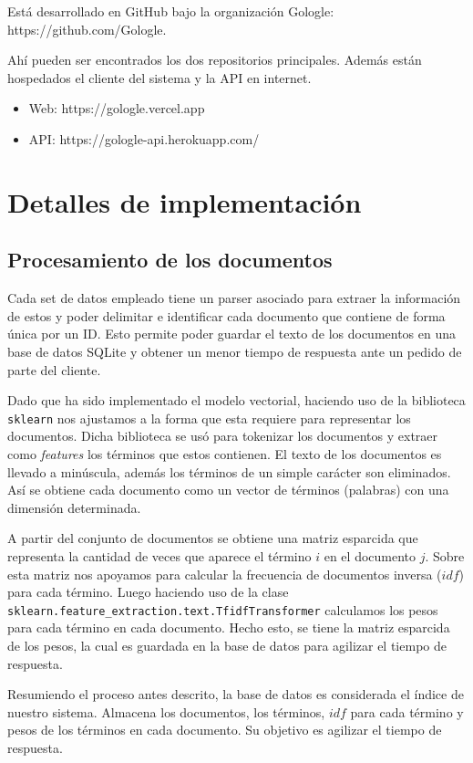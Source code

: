\documentclass[a4paper,11pt]{article}
\begin{document}
Está desarrollado en GitHub bajo la organización Gologle: https://github.com/Gologle.

Ahí pueden ser encontrados los dos repositorios principales. Además están hospedados el cliente del sistema y la API en internet.

\begin{itemize}
  \item Web: https://gologle.vercel.app
  \item API: https://gologle-api.herokuapp.com/
\end{itemize}

\section{Detalles de implementación}

\subsection{Procesamiento de los documentos}
Cada set de datos empleado tiene un parser asociado para extraer la información de estos y poder delimitar e identificar cada documento que contiene de forma única por un ID. Esto permite poder guardar el texto de los documentos en una base de datos SQLite y obtener un menor tiempo de respuesta ante un pedido de parte del cliente.

Dado que ha sido implementado el modelo vectorial, haciendo uso de la biblioteca \verb+sklearn+ nos ajustamos a la forma que esta requiere para representar los documentos. Dicha biblioteca se usó para tokenizar los documentos y extraer como \textit{features} los términos que estos contienen. El texto de los documentos es llevado a minúscula, además los términos de un simple carácter son eliminados. Así se obtiene cada documento como un vector de términos (palabras) con una dimensión determinada.

A partir del conjunto de documentos se obtiene una matriz esparcida que representa la cantidad de veces que aparece el término $i$ en el documento $j$. Sobre esta matriz nos apoyamos para calcular la frecuencia de documentos inversa ($idf$) para cada término. Luego haciendo uso de la clase \verb+sklearn.feature_extraction.text.TfidfTransformer+ calculamos los pesos para cada término en cada documento. Hecho esto, se tiene la matriz esparcida de los pesos, la cual es guardada en la base de datos para agilizar el tiempo de respuesta.

Resumiendo el proceso antes descrito, la base de datos es considerada el índice de nuestro sistema. Almacena los documentos, los términos, $idf$ para cada término y pesos de los términos en cada documento. Su objetivo es agilizar el tiempo de respuesta.
\end{document}
